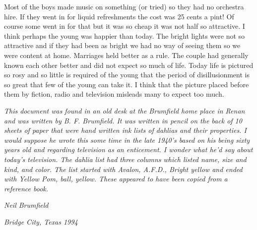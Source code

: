 Most of the boys made music on something (or tried) so they had no orchestra hire. If they went in for liquid refreshments the cost was 25 cents a pint! Of course some went in for that but it was so cheap it was not half so attractive. I think perhaps the young was happier than today. The bright lights were not so attractive and if they had been as bright we had no way of seeing them so we were content at home. Marriages held better as a rule. The couple had generally known each other better and did not expect so much of life. Today life is pictured so rosy and so little is required of the young that the period of disillusionment is so great that few of the young can take it. I think that the picture placed before them by fiction, radio and television misleads many to expect too much.     

\textit{This document was found in an old desk at the Brumfield home place in Renan and was written by B. F. Brumfield. It was written in pencil on the back of 10 sheets of paper that were hand written ink lists of dahlias and their properties. I would suppose he wrote this some time in the late 1940's based on his being sixty years old and regarding television as an enticement. I wonder what he'd say about today's television. The dahlia list had three columns which listed name, size and kind, and color. The list started with Avalon, A.F.D., Bright yellow and ended with Yellow Pom, ball, yellow. These appeared to have been copied from a reference book.}

\textit{Neil Brumfield}

\textit{Bridge City, Texas 1994}

